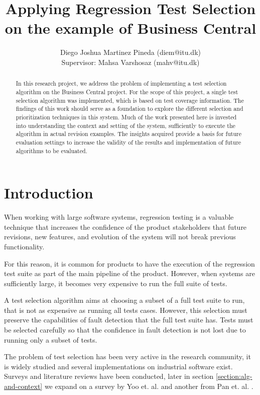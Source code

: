 \documentclass{article}
\title{Applying Regression Test Selection on the example of Business Central}
\author{Diego Joshua Martinez Pineda (diem@itu.dk)\\Supervisor: Mahsa Varshosaz (mahv@itu.dk)}
\begin{document}
\maketitle

\begin{abstract}
In this research project, we address the problem of implementing a test selection algorithm on the Business Central project. For the scope of this project, a single test selection algorithm was implemented, which is based on test coverage information. The findings of this work should serve as a foundation to explore the different selection and prioritization techniques in this system. Much of the work presented here is invested into understanding the context and setting of the system, sufficiently to execute the algorithm in actual revision examples. The insights acquired provide a basis for future evaluation settings to increase the validity of the results and implementation of future algorithms to be evaluated.
\end{abstract}

\section{Introduction}\label{section:overview}
   When working with large software systems, regression testing is a valuable technique that increases the confidence of the product stakeholders that future revisions, new features, and evolution of the system will not break previous functionality.

   For this reason, it is common for products to have the execution of the regression test suite as part of the main pipeline of the product. However, when systems are sufficiently large, it becomes very expensive to run the full suite of tests.

   A test selection algorithm aims at choosing a subset of a full test suite to run, that is not as expensive as running all tests cases. However, this selection must preserve the capabilities of fault detection that the full test suite has. Tests must be selected carefully so that the confidence in fault detection is not lost due to running only a subset of tests.

   The problem of test selection has been very active in the research community, it is widely studied and several implementations on industrial software exist. Surveys and literature reviews have been conducted, later in section \ref{section:alg-and-context} we expand on a survey by Yoo et. al. \cite{Yoo2009RegressionTM} and another from Pan et. al. \cite{Pan2021TestCS}.
\end{document}
